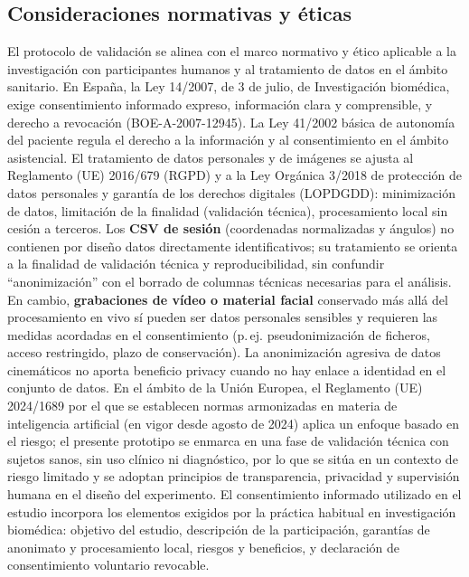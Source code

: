 \documentclass[11pt,a4paper]{article}
\begin{document}
\subsection{Consideraciones normativas y éticas}
El protocolo de validación se alinea con el marco normativo y ético aplicable a la investigación con participantes humanos y al tratamiento de datos en el ámbito sanitario. En España, la Ley 14/2007, de 3 de julio, de Investigación biomédica, exige consentimiento informado expreso, información clara y comprensible, y derecho a revocación (BOE-A-2007-12945). La Ley 41/2002 básica de autonomía del paciente regula el derecho a la información y al consentimiento en el ámbito asistencial. El tratamiento de datos personales y de imágenes se ajusta al Reglamento (UE) 2016/679 (RGPD) y a la Ley Orgánica 3/2018 de protección de datos personales y garantía de los derechos digitales (LOPDGDD): minimización de datos, limitación de la finalidad (validación técnica), procesamiento local sin cesión a terceros. Los \textbf{CSV de sesión} (coordenadas normalizadas y ángulos) no contienen por diseño datos directamente identificativos; su tratamiento se orienta a la finalidad de validación técnica y reproducibilidad, sin confundir ``anonimización'' con el borrado de columnas técnicas necesarias para el análisis. En cambio, \textbf{grabaciones de vídeo o material facial} conservado más allá del procesamiento en vivo sí pueden ser datos personales sensibles y requieren las medidas acordadas en el consentimiento (p.\,ej. pseudonimización de ficheros, acceso restringido, plazo de conservación). La anonimización agresiva de datos cinemáticos no aporta beneficio privacy cuando no hay enlace a identidad en el conjunto de datos. En el ámbito de la Unión Europea, el Reglamento (UE) 2024/1689 por el que se establecen normas armonizadas en materia de inteligencia artificial (en vigor desde agosto de 2024) aplica un enfoque basado en el riesgo; el presente prototipo se enmarca en una fase de validación técnica con sujetos sanos, sin uso clínico ni diagnóstico, por lo que se sitúa en un contexto de riesgo limitado y se adoptan principios de transparencia, privacidad y supervisión humana en el diseño del experimento. El consentimiento informado utilizado en el estudio incorpora los elementos exigidos por la práctica habitual en investigación biomédica: objetivo del estudio, descripción de la participación, garantías de anonimato y procesamiento local, riesgos y beneficios, y declaración de consentimiento voluntario revocable.
\end{document}
